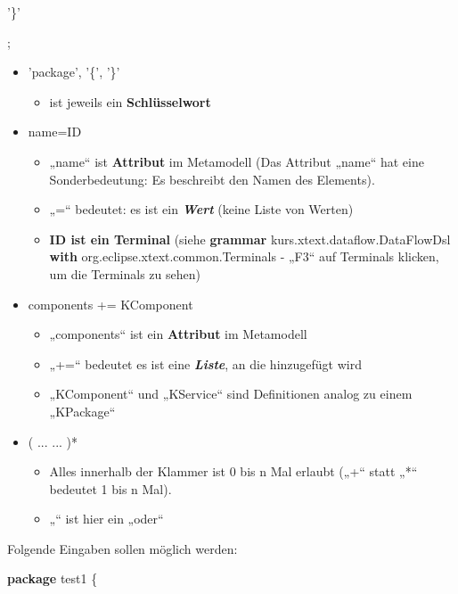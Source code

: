\documentclass[a4]{article}
\providecommand{\tightlist}{%
  \setlength{\itemsep}{0pt}\setlength{\parskip}{0pt}}
\begin{document}
'\}'

;

\begin{itemize}
\item
  'package', '\{', '\}'

  \begin{itemize}
  \tightlist
  \item
    ist jeweils ein \textbf{Schlüsselwort}
  \end{itemize}
\item
  name=ID

  \begin{itemize}
  \tightlist
  \item
    „name`` ist \textbf{Attribut }im Metamodell (Das Attribut „name``
    hat eine Sonderbedeutung: Es beschreibt den Namen des Elements).
  \item
    „=`` bedeutet: es ist ein \emph{\textbf{Wert}}\textbf{ }(keine Liste
    von Werten)
  \item
    \textbf{ID ist ein Terminal} (siehe \textbf{grammar}
    kurs.xtext.dataflow.DataFlowDsl \textbf{with}
    org.eclipse.xtext.common.Terminals - „F3`` auf Terminals klicken, um
    die Terminals zu sehen)
  \end{itemize}
\item
  components += KComponent

  \begin{itemize}
  \tightlist
  \item
    „components`` ist ein \textbf{Attribut }im Metamodell
  \item
    „+=`` bedeutet es ist eine \emph{\textbf{Liste}}, an die hinzugefügt
    wird
  \item
    „KComponent`` und „KService`` sind Definitionen analog zu einem
    „KPackage`` 
  \end{itemize}
\item
  ( ... \textbar{} ... )*

  \begin{itemize}
  \tightlist
  \item
    Alles innerhalb der Klammer ist 0 bis n Mal erlaubt („+`` statt „*``
    bedeutet 1 bis n Mal).
  \item
    „\textbar{}`` ist hier ein „oder``
  \end{itemize}
\end{itemize}

Folgende Eingaben sollen möglich werden:

\textbf{package} test1 \{
\end{document}
